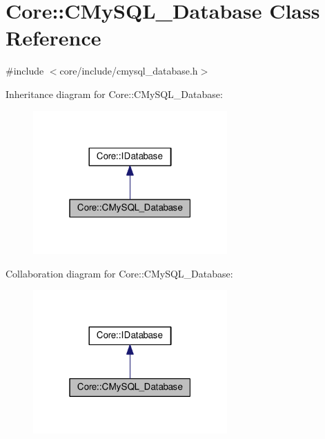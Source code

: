 \hypertarget{classCore_1_1CMySQL__Database}{}\section{Core\+:\+:C\+My\+S\+Q\+L\+\_\+\+Database Class Reference}
\label{classCore_1_1CMySQL__Database}


{\ttfamily \#include $<$core/include/cmysql\+\_\+database.\+h$>$}



Inheritance diagram for Core\+:\+:C\+My\+S\+Q\+L\+\_\+\+Database\+:\nopagebreak
\begin{figure}[H]
\begin{center}
\leavevmode
\includegraphics[width=211pt]{classCore_1_1CMySQL__Database__inherit__graph}
\end{center}
\end{figure}


Collaboration diagram for Core\+:\+:C\+My\+S\+Q\+L\+\_\+\+Database\+:\nopagebreak
\begin{figure}[H]
\begin{center}
\leavevmode
\includegraphics[width=211pt]{classCore_1_1CMySQL__Database__coll__graph}
\end{center}
\end{figure}
